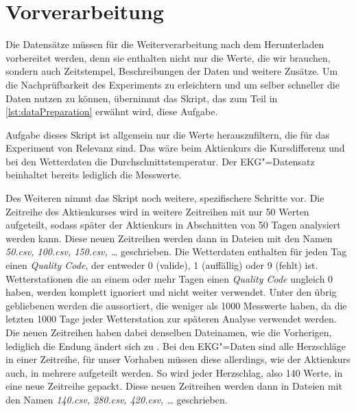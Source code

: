 \section{Vorverarbeitung}
Die Datensätze müssen für die Weiterverarbeitung nach dem Herunterladen vorbereitet werden, denn sie enthalten nicht nur die Werte, die wir brauchen, sondern auch Zeitstempel, Beschreibungen der Daten und weitere Zusätze. Um die Nachprüfbarkeit des Experiments zu erleichtern und um selber schneller die Daten nutzen zu können, übernimmt das Skript, das zum Teil in \autoref{lst:dataPreparation} erwähnt wird, diese Aufgabe.

Aufgabe dieses Skript ist allgemein nur die Werte herauszufiltern, die für das Experiment von Relevanz sind. Das wäre beim Aktienkurs die Kursdifferenz und bei den Wetterdaten die Durchschnittstemperatur. Der EKG"=Datensatz beinhaltet bereits lediglich die Messwerte. 

Des Weiteren nimmt das Skript noch weitere, spezifischere Schritte vor. Die Zeitreihe des Aktienkurses wird in weitere Zeitreihen mit nur 50 Werten aufgeteilt, sodass später der Aktienkurs in Abschnitten von 50 Tagen analysiert werden kann. Diese neuen Zeitreihen werden dann in Dateien mit den Namen \textit{50.csv, 100.csv, 150.csv, \dots} geschrieben. Die Wetterdaten enthalten für jeden Tag einen \textit{Quality Code}, der entweder 0 (valide), 1 (auffällig) oder 9 (fehlt) ist. Wetterstationen die an einem oder mehr Tagen einen \textit{Quality Code} ungleich 0 haben, werden komplett ignoriert und nicht weiter verwendet. Unter den übrig gebliebenen werden die aussortiert, die weniger als 1000 Messwerte haben, da die letzten 1000 Tage jeder Wetterstation zur späteren Analyse verwendet werden. Die neuen Zeitreihen haben dabei denselben Dateinamen, wie die Vorherigen, lediglich die Endung ändert sich zu . Bei den EKG"=Daten sind alle Herzschläge in einer Zeitreihe, für unser Vorhaben müssen diese allerdings, wie der Aktienkurs auch, in mehrere aufgeteilt werden. So wird jeder Herzschlag, also 140 Werte, in eine neue Zeitreihe gepackt. Diese neuen Zeitreihen werden dann in Dateien mit den Namen \textit{140.csv, 280.csv, 420.csv, \dots} geschrieben.